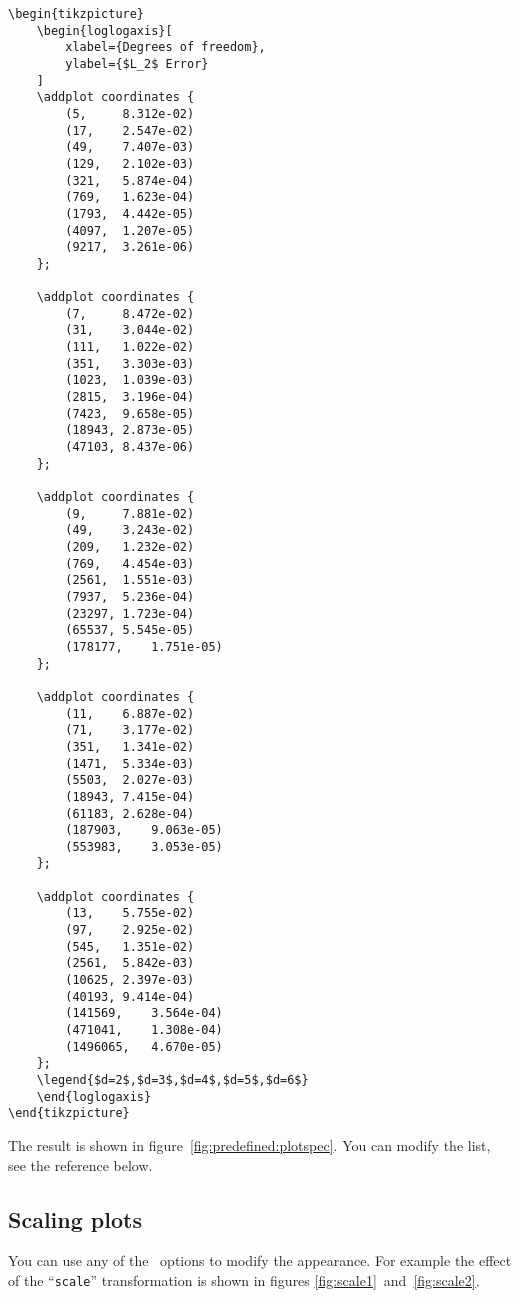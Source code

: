\begin{lstlisting}
\begin{tikzpicture}
	\begin{loglogaxis}[
		xlabel={Degrees of freedom},
		ylabel={$L_2$ Error}
	]
	\addplot coordinates {
		(5,		8.312e-02)
		(17,	2.547e-02)
		(49,	7.407e-03)
		(129,	2.102e-03)
		(321,	5.874e-04)
		(769,	1.623e-04)
		(1793,	4.442e-05)
		(4097,	1.207e-05)
		(9217,	3.261e-06)
	};

	\addplot coordinates {
		(7,		8.472e-02)
		(31,	3.044e-02)
		(111,	1.022e-02)
		(351,	3.303e-03)
		(1023,	1.039e-03)
		(2815,	3.196e-04)
		(7423,	9.658e-05)
		(18943,	2.873e-05)
		(47103,	8.437e-06)
	};

	\addplot coordinates {
		(9,		7.881e-02)
		(49,	3.243e-02)
		(209,	1.232e-02)
		(769,	4.454e-03)
		(2561,	1.551e-03)
		(7937,	5.236e-04)
		(23297,	1.723e-04)
		(65537,	5.545e-05)
		(178177,	1.751e-05)
	};

	\addplot coordinates {
		(11,	6.887e-02)
		(71,	3.177e-02)
		(351,	1.341e-02)
		(1471,	5.334e-03)
		(5503,	2.027e-03)
		(18943,	7.415e-04)
		(61183,	2.628e-04)
		(187903,	9.063e-05)
		(553983,	3.053e-05)
	};

	\addplot coordinates {
		(13,	5.755e-02)
		(97,	2.925e-02)
		(545,	1.351e-02)
		(2561,	5.842e-03)
		(10625,	2.397e-03)
		(40193,	9.414e-04)
		(141569,	3.564e-04)
		(471041,	1.308e-04)
		(1496065,	4.670e-05)
	};
	\legend{$d=2$,$d=3$,$d=4$,$d=5$,$d=6$}
	\end{loglogaxis}
\end{tikzpicture}
\end{lstlisting}

The result is shown in figure~\ref{fig:predefined:plotspec}. You can modify the list, see the reference below.

\subsection{Scaling plots}
You can use any of the \Tikz\ options to modify the appearance. For example the effect of the ``\texttt{scale}'' transformation is shown in figures \ref{fig:scale1}~and~\ref{fig:scale2}.

